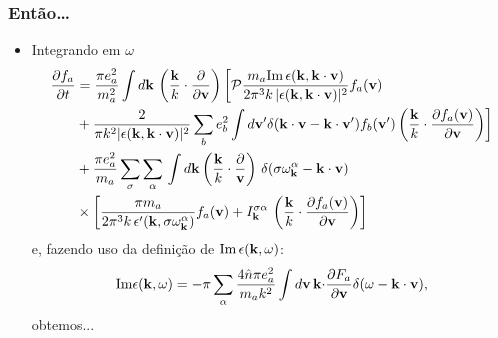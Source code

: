 \documentclass[10pt,aspectratio=1610,lualatex]{beamer}
\begin{document}
\begin{frame}
  \frametitle{Então\dots}
  \begin{itemize}
    \item Integrando em $\omega$
    \begin{equation*}
      \begin{split}
	\frac{\partial f_a}{\partial t}
	&=\frac{\pi e_a^2}{m_a^2} \int d{\bf k}\,
	\left( \frac{\bf k}{k}\cdot \frac{\partial}{\partial {\bf v}}
	\right) \biggl[\mathcal{P}
	\frac{m_a\mbox{Im}\,\epsilon({\bf k},{\bf k \cdot v})}
          {2\pi^3k\, |\epsilon({\bf k},{\bf k \cdot v})|^2}f_a({\bf v})\\
	&+\frac{2}{\pi k^2|\epsilon({\bf k},{\bf k \cdot v})|^2} \sum_b
	e_b^2\int d{\bf v'} \delta({\bf k \cdot v}-{\bf k\cdot v'})
	f_b({\bf v '})\left( \frac{\bf k}{k}\cdot
	  \frac{\partial f_a({\bf v})}{\partial {\bf v}}\right)\biggr]\\
	&+\frac{\pi e_a^2}{m_a}\sum_\sigma\sum_\alpha\,
	\int d{\bf k} \left( \frac{\bf k}{k} \cdot
	  \frac{\partial}{\bf v} \right)\,
	\delta(\sigma\omega_{\bf k}^\alpha-{\bf k \cdot v})\\
	&\times\left[ \frac{\pi m_a}{2\pi^3 k\,
	  \epsilon '({\bf k},\sigma\omega_{\bf k}^\alpha)}
	f_a({\bf v}) + I_{\bf k}^{\sigma \alpha}\,
	\left(\frac{\bf k}{k}\cdot
	  \frac{\partial f_a({\bf v})}{\partial {\bf v}}\right) \right]
      \end{split}
    \end{equation*}
    e, fazendo uso da definição de $\mbox{Im}\,\epsilon({\bf k},\omega)$:
    \begin{displaymath}
      \mbox{Im}\epsilon({\bf k},\omega)
      =-\pi \sum_\alpha \frac{4\hat n \pi e_a^2}{m_a k^2}
      \int d{\bf v}\,{\bf k \cdot}
      \frac{\partial F_a}{\partial {\bf v}}
      \delta(\omega-{\bf k\cdot v}),
    \end{displaymath}
    obtemos...
  \end{itemize}
\end{frame}
\end{document}

